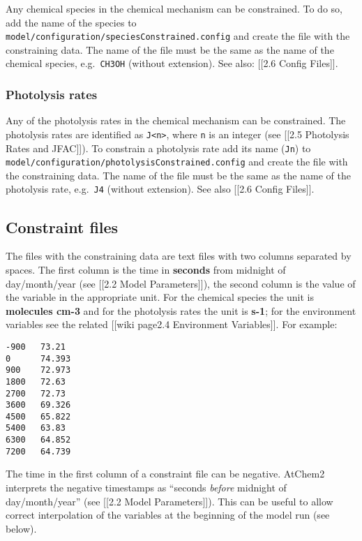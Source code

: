 Any chemical species in the chemical mechanism can be constrained. To do
so, add the name of the species to
\texttt{model/configuration/speciesConstrained.config} and create the
file with the constraining data. The name of the file must be the same
as the name of the chemical species, e.g.~\texttt{CH3OH} (without
extension). See also: {[}{[}2.6 Config Files{]}{]}.

\subsubsection{Photolysis rates}\label{photolysis-rates}

Any of the photolysis rates in the chemical mechanism can be
constrained. The photolysis rates are identified as
\texttt{J\textless{}n\textgreater{}}, where \texttt{n} is an integer
(see {[}{[}2.5 Photolysis Rates and JFAC{]}{]}). To constrain a
photolysis rate add its name (\texttt{Jn}) to
\texttt{model/configuration/photolysisConstrained.config} and create the
file with the constraining data. The name of the file must be the same
as the name of the photolysis rate, e.g.~\texttt{J4} (without
extension). See also {[}{[}2.6 Config Files{]}{]}.

\subsection{Constraint files}\label{constraint-files}

The files with the constraining data are text files with two columns
separated by spaces. The first column is the time in \textbf{seconds}
from midnight of day/month/year (see {[}{[}2.2 Model Parameters{]}{]}),
the second column is the value of the variable in the appropriate unit.
For the chemical species the unit is \textbf{molecules cm-3} and for the
photolysis rates the unit is \textbf{s-1}; for the environment variables
see the related {[}{[}wiki page\textbar{}2.4 Environment
Variables{]}{]}. For example:

\begin{verbatim}
-900   73.21
0      74.393
900    72.973
1800   72.63
2700   72.73
3600   69.326
4500   65.822
5400   63.83
6300   64.852
7200   64.739
\end{verbatim}

The time in the first column of a constraint file can be negative.
AtChem2 interprets the negative timestamps as ``seconds \emph{before}
midnight of day/month/year'' (see {[}{[}2.2 Model Parameters{]}{]}).
This can be useful to allow correct interpolation of the variables at
the beginning of the model run (see below).

